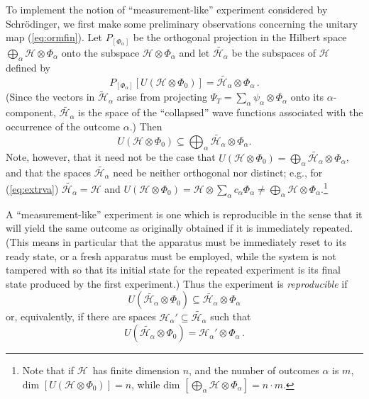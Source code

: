 \documentclass[12pt]{article}
\newcommand{\Sc}{Schr\"{o}dinger}
\newcommand{\wf}{wave function}
\renewcommand{\a}{\alpha}
\newcommand{\suma}{\sum_{\a }}
\newcommand{\ot}{\otimes}
\newcommand{\biga}{\bigoplus_{\a}}
\newcommand{\psia}{\psi_{\a}}
\newcommand{\Phia}{\Phi_{\a}}
\newcommand{\Ha}{{\H}_{\a}}
\renewcommand{\H}{\mbox{$\mathcal{H}$}}
\begin{document}
To implement the notion of ``measurement-like'' experiment considered
by \Sc{}, we first make some preliminary observations concerning the
unitary map (\ref{eq:ormfin}).  Let $P_{[\Phia]}$ be the orthogonal
projection in the Hilbert space $\biga \mathcal{H}\ot\Phia$ onto the
subspace ${\H}\ot\Phia$ and let $\widetilde{\mathcal{H}_{\a}}$ be the
subspaces of $\H$ defined by
%
\begin{equation}
P_{[\Phia]}\left[ U({\H}\ot\Phi_0) \right]
=\widetilde{\mathcal{H}_{\a}}\ot\Phia\,.
\label{eq:htilde}
\end{equation}
%
(Since the vectors in $\widetilde{\mathcal{H}}_{\a}$ arise {}from
projecting $\Psi_{T}=\suma \psia \ot \Phia$ onto its $\a$-component,
$\widetilde{\mathcal{H}_{\a}}$ is the space of the ``collapsed''
\wf{}s associated with the occurrence of the outcome $\a$.)  Then
\begin{equation}
U({\H}\ot\Phi_0) \subseteq
\biga\widetilde{\mathcal{H}_{\a}}\ot\Phia.
\label{eq:rep2}
\end{equation}
Note, however, that it need not be the case that
$U({\H}\ot\Phi_0)=\biga\widetilde{\mathcal{H}_{\a}}\ot\Phia$, and that
the spaces $\widetilde{\mathcal{H}_{\a}}$ need be neither orthogonal
nor distinct; e.g., for (\ref{eq:extrva})
$\widetilde{\mathcal{H}_{\a}}=\H$ and $U({\H}\ot\Phi_0)=\H\ot\sum_\a
c_\a\Phia\neq\biga {\H}\ot\Phia$.\footnote{Note that if \H\ has finite
   dimension $n$, and the number of outcomes $\a$ is $m$, $\mbox{dim
   }[U({\H}\ot\Phi_0)]= n$, while $\mbox{dim }[\biga {\H}\ot\Phia] =
   n\cdot m$.}

A ``measurement-like'' experiment is one which is reproducible in the
sense that it will yield the same outcome as originally obtained if it
is immediately repeated.  (This means in particular that the apparatus
must be immediately reset to its ready state, or a fresh apparatus
must be employed, while the system is not tampered with so that its
initial state for the repeated experiment is its final state produced
by the first experiment.)  Thus the experiment is \emph{reproducible}
if
\begin{equation}
U(\widetilde{\mathcal{H}_{\a}}\ot\Phi_0) \subseteq
\widetilde{\mathcal{H}_{\a}}\ot\Phia \label{eq:repconold}
\end{equation}
or, equivalently, if there are spaces ${\Ha}'\subseteq
\widetilde{\mathcal{H}_{\a}}$ such that
\begin{equation}
U(\widetilde{\mathcal{H}_{\a}}\ot\Phi_0) = {\Ha}'\ot\Phia
\label{eq:repcon}\,.
\end{equation}
\end{document}
